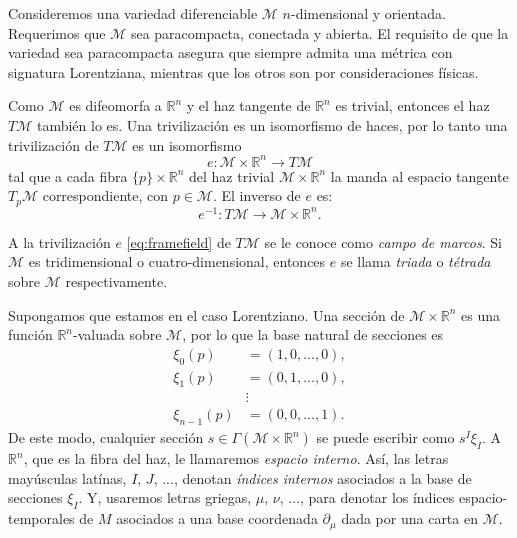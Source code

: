 
Consideremos una variedad diferenciable $\mathcal{M}$ $n$-dimensional y orientada. Requerimos que $\mathcal{M}$ sea paracompacta, conectada y abierta. El requisito de que la variedad sea paracompacta asegura que siempre admita una m\'{e}trica con signatura Lorentziana, mientras que los otros son por consideraciones f\'{i}sicas.

Como $\mathcal{M}$ es difeomorfa a $\mathbb{R}^n$ y el haz tangente de $\mathbb{R}^{n}$ es trivial, entonces el haz $T \mathcal{M}$ tambi\'{e}n lo es. Una trivilizaci\'{o}n es un isomorfismo de haces, por lo tanto una trivilizaci\'{o}n de $T \mathcal{M}$ es un isomorfismo
%
\begin{equation}
\label{eq:framefield}
e: \mathcal{M} \times \mathbb{R}^{n} \rightarrow T \mathcal{M}
\end{equation}
%
tal que a cada fibra $\{p\} \times \mathbb{R}^{n}$ del haz trivial $\mathcal{M} \times \mathbb{R}^{n}$ la manda al espacio tangente $T_{p} \mathcal{M}$ correspondiente, con $p \in \mathcal{M}$. El inverso de $e$ es:
%
\begin{equation}
\label{eq:invframefield}
e^{-1}: T \mathcal{M} \rightarrow \mathcal{M} \times \mathbb{R}^{n}.
\end{equation}

A la trivilizaci\'{o}n $e$ \eqref{eq:framefield} de $T \mathcal{M}$ se le conoce como \emph{campo de marcos}. Si $\mathcal{M}$ es tridimensional o cuatro-dimensional, entonces $e$ se llama \emph{triada} o \emph{t\'{e}trada} sobre $\mathcal{M}$ respectivamente.

Supongamos que estamos en el caso Lorentziano. Una secci\'{o}n de $\mathcal{M} \times \mathbb{R}^{n}$ es una funci\'{o}n $\mathbb{R}^{n}$-valuada sobre $\mathcal{M}$, por lo que la base natural de secciones es
%
\begin{align*}
\xi_{0}(p) & = (1, 0,..., 0), \\
\xi_{1}(p) & = (0, 1,..., 0),\\
& \vdots \\
\xi_{n-1}(p) & = (0, 0,..., 1).
\end{align*}
%
De este modo, cualquier secci\'{o}n $s \in \Gamma (\mathcal{M} \times  \mathbb{R}^{n})$ se puede escribir como $s^{I} \xi_{I}$. A $\mathbb{R}^{n}$, que es la fibra del haz, le llamaremos \emph{espacio interno}. As\'{i}, las letras may\'{u}sculas lat\'{i}nas, $I, \, J, \, ...$, denotan \emph{\'{i}ndices internos} asociados a la base de secciones $\xi_{I}$. Y, usaremos letras griegas, $\mu, \, \nu, \, ...$, para denotar los \'{i}ndices espacio-temporales de $M$ asociados a una base coordenada $\partial_{\mu}$ dada por una carta en $\mathcal{M}$.

